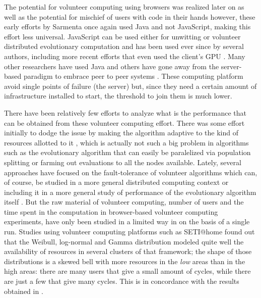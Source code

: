 \documentclass{sig-alternate}
\begin{document}
The potential for volunteer computing using browsers was realized
later on \cite{sarmenta-bayanihan} as well as the potential for
mischief of users with code in their hands
\cite{sarmenta-sabotagetolerance} however, these early efforts by
Sarmenta once again used Java and not JavaScript, making this effort
less universal. JavaScript can be used either for unwitting
\cite{unwitting-ec} or volunteer
\cite{langdon:2005:metas,gecco07:workshop:dcor} distributed
evolutionary computation and has been used ever since by several
authors, including more recent efforts \cite{Desell:2008:AHG:1389095.1389273,duda2013distributed,DBLP:journals/corr/abs-0801-1210} that even
used the client's GPU \cite{duda2013gpu}. Many other researchers have
used Java \cite{chong:1999:jDGPi} and others have gone away from the
server-based paradigm to embrace peer to peer systems
\cite{jin2006constructing,10.1109/ICICSE.2008.99}. These computing
platform avoid single points of failure (the server) but, since they
need a certain amount of infrastructure installed to start, the
threshold to join them is much lower. 

There have been relatively few efforts to analyze what is the
performance that can be obtained from these volunteer computing
effort. There was some effort initially to dodge the issue by making
the algorithm adaptive to the kind of resources allotted to it
\cite{milani2004online}, which is actually not such a big problem in
algorithms such as the evolutionary algorithm that can easily be
paralelized via population splitting or farming out evaluations to all
the nodes available. Lately, several approaches have focused on the
fault-tolerance of volunteer algorithms
\cite{gonzalez2010characterizing} which can, of course, be studied in
a more general distributed computing context
\cite{nogueras2015studying} or including it in a more general study of
performance of the evolutionary algorithm itself
\cite{DBLP:journals/gpem/LaredoBGVAGF14}. But the raw material of
volunteer computing, number of users and the time spent in the
computation in browser-based volunteer computing experiments, have only been studied in a limited way in
\cite{DBLP:journals/gpem/LaredoBGVAGF14} on the basis of a single
run. Studies using volunteer computing platforms such as SETI@home
\cite{javadi2009mining} found out that the Weibull, log-normal and Gamma distribution
modeled quite well the availability of resources in several clusters
of that framework; the shape of those distributions is a skewed bell
with more resources in the {\em low} areas than in the high areas:
there are many users that give a small amount of cycles, while there
are just a few that give many cycles. This is in concordance with the
results obtained in \cite{agajaj}.
\end{document}
